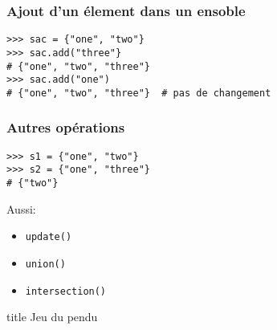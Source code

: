 \documentclass{beamer}
\begin{document}
\begin{frame}[fragile]
  \frametitle{Ajout d'un élement dans un ensoble}
\begin{lstlisting}
>>> sac = {"one", "two"}
>>> sac.add("three"}
# {"one", "two", "three"}
>>> sac.add("one")
# {"one", "two", "three"}  # pas de changement
\end{lstlisting}
\end{frame}

\begin{frame}[fragile]
  \frametitle{Autres opérations}
\begin{lstlisting}
>>> s1 = {"one", "two"}
>>> s2 = {"one", "three"}
# {"two"}
\end{lstlisting}

Aussi:

\begin{itemize}
  \item \texttt{update()}
  \item \texttt{union()}
  \item \texttt{intersection()}
\end{itemize}
\end{frame}

\begin{frame}[fragile]

  \begin{beamercolorbox}[sep=8pt,center,shadow=true,rounded=true]{title}
    Jeu du pendu
  \end{beamercolorbox}

\end{frame}
\end{document}

